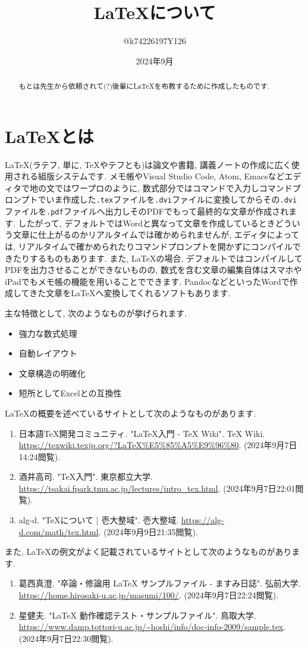 \documentclass[10pt,a4paper]{jsarticle}
\title{\LaTeX について}
\author{@k74226197Y126}
\date{2024年9月}
\begin{document}
\maketitle
\begin{abstract}
    もとは先生から依頼されて(?)後輩にLaTeXを布教するために作成したものです. 
\end{abstract}
\section{\LaTeX とは}
\LaTeX (ラテフ, 単に, TeXやテフとも)は論文や書籍, 講義ノートの作成に広く使用される組版システムです. メモ帳やVisual Studio Code, Atom, Emacsなどエディタで地の文ではワープロのように, 数式部分ではコマンドで入力しコマンドプロンプトでいま作成した\verb|.tex|ファイルを\verb|.dvi|ファイルに変換してからその\verb|.dvi|ファイルを\verb|.pdf|ファイルへ出力しそのPDFでもって最終的な文章が作成されます. したがって, デフォルトではWordと異なって文章を作成しているときどういう文章に仕上がるのかリアルタイムでは確かめられませんが, エディタによっては, リアルタイムで確かめられたりコマンドプロンプトを開かずにコンパイルできたりするものもあります. また, \LaTeX の場合, デフォルトではコンパイルしてPDFを出力させることができないものの, 数式を含む文章の編集自体はスマホやiPadでもメモ帳の機能を用いることでできます. PandocなどといったWordで作成してきた文章を\LaTeX へ変換してくれるソフトもあります. \par
主な特徴として, 次のようなものが挙げられます. 
\begin{itemize}
    \item 強力な数式処理
    \item 自動レイアウト
    \item 文章構造の明確化
    \item 短所としてExcelとの互換性
\end{itemize}
\LaTeX の概要を述べているサイトとして次のようなものがあります. 
\begin{enumerate}
    \renewcommand{\labelenumi}{[\arabic{enumi}]\ }
    \setcounter{enumi}{0}
    \item 日本語TeX開発コミュニティ. "LaTeX入門 - TeX Wiki". TeX Wiki. \url{https://texwiki.texjp.org/?LaTeX%E5%85%A5%E9%96%80}. (2024年9月7日14:24閲覧). 
    \item 酒井高司. "TeX入門". 東京都立大学. \url{https://tsakai.fpark.tmu.ac.jp/lectures/intro_tex.html}. (2024年9月7日22:01閲覧). 
    \item alg-d. "TeXについて | 壱大整域". 壱大整域. \url{https://alg-d.com/math/tex.html}. (2024年9月9日21:35閲覧). 
\end{enumerate}
また, \LaTeX の例文がよく記載されているサイトとして次のようなものがあります. 
\begin{enumerate}
    \renewcommand{\labelenumi}{[\arabic{enumi}]\ }
    \setcounter{enumi}{3}
    \item 葛西真澄. "卒論・修論用 LaTeX サンプルファイル - ますみ日誌". 弘前大学. \url{https://home.hirosaki-u.ac.jp/masumi/100/}. (2024年9月7日22:24閲覧). 
    \item 星健夫. "LaTeX 動作確認テスト・サンプルファイル". 鳥取大学. \url{https://www.damp.tottori-u.ac.jp/~hoshi/info/doc-info-2009/sample.tex}. (2024年9月7日22:30閲覧). 
\end{enumerate}
\end{document}
